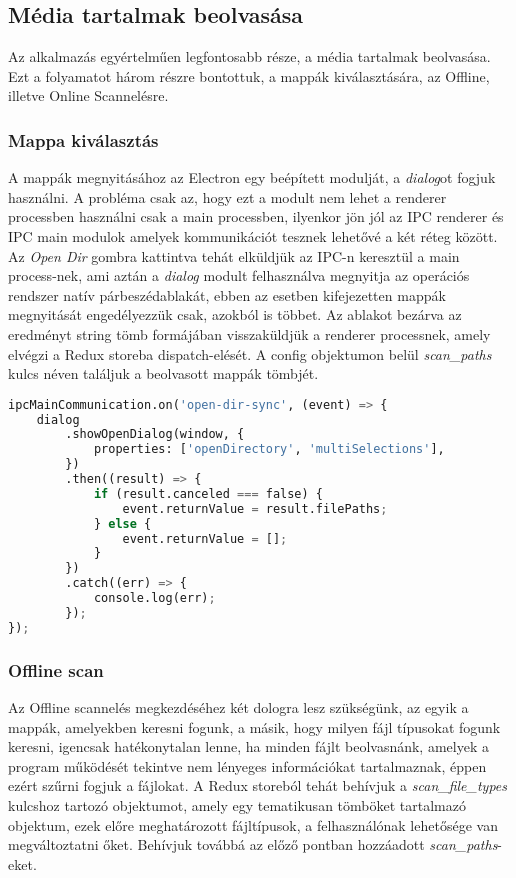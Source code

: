 \subsection{Média tartalmak beolvasása}
Az alkalmazás egyértelműen legfontosabb része, a média tartalmak beolvasása. Ezt a folyamatot három részre bontottuk, a mappák kiválasztására, az Offline, illetve Online Scannelésre.

\subsubsection{Mappa kiválasztás}
A mappák megnyitásához az Electron egy beépített modulját, a {\it dialog}ot fogjuk használni. A probléma csak az, hogy ezt a modult nem lehet a renderer processben használni csak a main processben, ilyenkor jön jól az IPC renderer és IPC main modulok amelyek kommunikációt tesznek lehetővé a két réteg között. Az {\it Open Dir} gombra kattintva tehát elküldjük az IPC-n keresztül a main process-nek, ami aztán a {\it dialog} modult felhasználva megnyitja az operációs rendszer natív párbeszédablakát, ebben az esetben kifejezetten mappák megnyitását engedélyezzük csak, azokból is többet. Az ablakot bezárva az eredményt string tömb formájában visszaküldjük a renderer processnek, amely elvégzi a Redux storeba dispatch-elését. A config objektumon belül {\it scan\_paths} kulcs néven találjuk a beolvasott mappák tömbjét.

\begin{lstlisting}[language={python}]
ipcMainCommunication.on('open-dir-sync', (event) => {
    dialog
        .showOpenDialog(window, {
            properties: ['openDirectory', 'multiSelections'],
        })
        .then((result) => {
            if (result.canceled === false) {
                event.returnValue = result.filePaths;
            } else {
                event.returnValue = [];
            }
        })
        .catch((err) => {
            console.log(err);
        });
});
\end{lstlisting}

\subsubsection{Offline scan}
Az Offline scannelés megkezdéséhez két dologra lesz szükségünk, az egyik a mappák, amelyekben keresni fogunk, a másik, hogy milyen fájl típusokat fogunk keresni, igencsak hatékonytalan lenne, ha minden fájlt beolvasnánk, amelyek a program működését tekintve nem lényeges információkat tartalmaznak, éppen ezért szűrni fogjuk a fájlokat. A Redux storeból tehát behívjuk a {\it scan\_file\_types} kulcshoz tartozó objektumot, amely egy tematikusan tömböket tartalmazó objektum, ezek előre meghatározott fájltípusok, a felhasználónak lehetősége van megváltoztatni őket. Behívjuk továbbá az előző pontban hozzáadott {\it scan\_paths}-eket.

